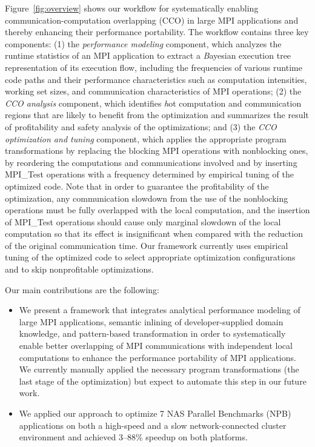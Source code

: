 Figure~\ref{fig:overview} shows our workflow for systematically
enabling communication-computation overlapping (CCO) in large MPI
applications and thereby enhancing their performance portability.  The
workflow contains three key components: (1) the \emph{performance
  modeling} component, which analyzes the runtime statistics of an MPI
application to extract a {\emph Bayesian execution
  tree\cite{jichi:ipdps14}} representation of its execution flow,
including the frequencies of various runtime code paths and their
performance characteristics such as computation intensities, working
set sizes, and communication characteristics of MPI operations; (2)
the \emph{CCO analysis} component, which identifies {\emph hot}
computation and communication regions that are likely to benefit from
the optimization and summarizes the result of profitability and safety
analysis of the optimizations; and (3) the \emph{CCO optimization and
  tuning} component, which applies the appropriate program
transformations by replacing the blocking MPI operations with
nonblocking ones, by reordering the computations and communications
involved and by inserting MPI\_Test operations with a frequency
determined by empirical tuning of the optimized code.  Note that in
order to guarantee the profitability of the optimization, any
communication slowdown from the use of the nonblocking operations must
be fully overlapped with the local computation, and the insertion of
MPI\_Test operations should cause only marginal slowdown of the local
computation so that its effect is insignificant when compared with the
reduction of the original communication time.  Our framework currently
uses empirical tuning of the optimized code to select appropriate
optimization configurations and to skip nonprofitable optimizations.

Our main contributions are the following:

\begin{itemize}

\item We present a framework that integrates analytical performance
  modeling of large MPI applications, semantic inlining of
  developer-supplied domain knowledge, and pattern-based
  transformation in order to systematically enable better overlapping
  of MPI communications with independent local computations to enhance
  the performance portability of MPI applications. We currently
  manually applied the necessary program transformations (the last
  stage of the optimization) but expect to automate this step in our
  future work.

\item We applied our approach to optimize 7 NAS Parallel Benchmarks
  (NPB) applications on both a high-speed and a slow network-connected
  cluster environment and achieved 3--88\% speedup on both platforms.

\end{itemize}

